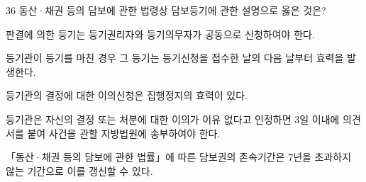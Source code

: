 \begin{question}{36}
동산·채권 등의 담보에 관한 법령상 담보등기에 관한 설명으로 옳은 것은?
\begin{choices}
  \item 판결에 의한 등기는 등기권리자와 등기의무자가 공동으로 신청하여야 한다.
  \item 등기관이 등기를 마친 경우 그 등기는 등기신청을 접수한 날의 다음 날부터 효력을 발생한다.
  \item 등기관의 결정에 대한 이의신청은 집행정지의 효력이 있다.
  \item 등기관은 자신의 결정 또는 처분에 대한 이의가 이유 없다고 인정하면 3일 이내에 의견서를 붙여 사건을 관할 지방법원에 송부하여야 한다.
  \item 「동산·채권 등의 담보에 관한 법률」에 따른 담보권의 존속기간은 7년을 초과하지 않는 기간으로 이를 갱신할 수 있다.
\end{choices}
\end{question}
